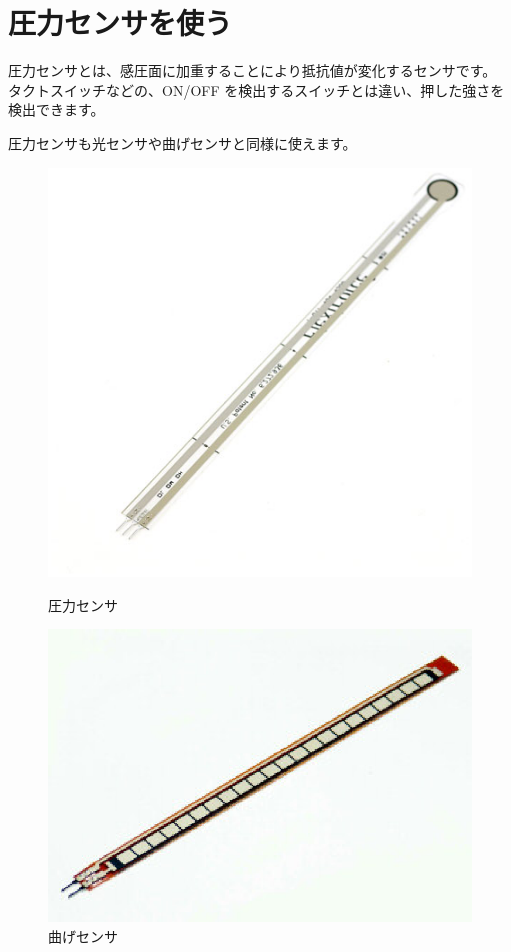 \documentclass[11pt,a4paper]{jarticle}
\begin{document}
\section{圧力センサを使う}
圧力センサとは、感圧面に加重することにより抵抗値が変化するセンサです。
タクトスイッチなどの、ON/OFF を検出するスイッチとは違い、押した強さを検出できます。


圧力センサも光センサや曲げセンサと同様に使えます。

\begin{figure}[h!]
 \begin{minipage}{0.5\columnwidth}
  \centering
  \includegraphics[width=\columnwidth]{img/pressure_sensor.eps}
  \caption{圧力センサ}
 \end{minipage}
 \begin{minipage}{0.5\columnwidth}
  \centering
  \includegraphics[width=\columnwidth]{img/flex_sensor.eps}
  \caption{曲げセンサ}
 \end{minipage}
\end{figure}
\end{document}
